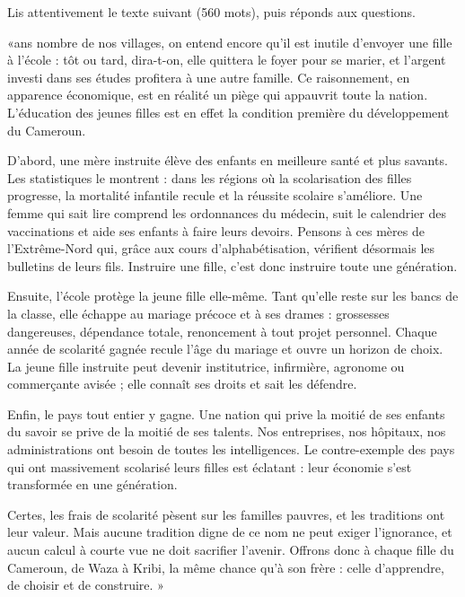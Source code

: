 \documentclass[11pt]{article}
\begin{document}
\begin{exercice}
Lis attentivement le texte suivant (560 mots), puis réponds aux questions.

\begin{itshape}«ans nombre de nos villages, on entend encore qu'il est inutile d'envoyer une fille à l'école : tôt ou tard, dira-t-on, elle quittera le foyer pour se marier, et l'argent investi dans ses études profitera à une autre famille. Ce raisonnement, en apparence économique, est en réalité un piège qui appauvrit toute la nation. L'éducation des jeunes filles est en effet la condition première du développement du Cameroun.

D'abord, une mère instruite élève des enfants en meilleure santé et plus savants. Les statistiques le montrent : dans les régions où la scolarisation des filles progresse, la mortalité infantile recule et la réussite scolaire s'améliore. Une femme qui sait lire comprend les ordonnances du médecin, suit le calendrier des vaccinations et aide ses enfants à faire leurs devoirs. Pensons à ces mères de l'Extrême-Nord qui, grâce aux cours d'alphabétisation, vérifient désormais les bulletins de leurs fils. Instruire une fille, c'est donc instruire toute une génération.

Ensuite, l'école protège la jeune fille elle-même. Tant qu'elle reste sur les bancs de la classe, elle échappe au mariage précoce et à ses drames : grossesses dangereuses, dépendance totale, renoncement à tout projet personnel. Chaque année de scolarité gagnée recule l'âge du mariage et ouvre un horizon de choix. La jeune fille instruite peut devenir institutrice, infirmière, agronome ou commerçante avisée ; elle connaît ses droits et sait les défendre.

Enfin, le pays tout entier y gagne. Une nation qui prive la moitié de ses enfants du savoir se prive de la moitié de ses talents. Nos entreprises, nos hôpitaux, nos administrations ont besoin de toutes les intelligences. Le contre-exemple des pays qui ont massivement scolarisé leurs filles est éclatant : leur économie s'est transformée en une génération.

Certes, les frais de scolarité pèsent sur les familles pauvres, et les traditions ont leur valeur. Mais aucune tradition digne de ce nom ne peut exiger l'ignorance, et aucun calcul à courte vue ne doit sacrifier l'avenir. Offrons donc à chaque fille du Cameroun, de Waza à Kribi, la même chance qu'à son frère : celle d'apprendre, de choisir et de construire. »\end{itshape}


\end{exercice}
\end{document}
